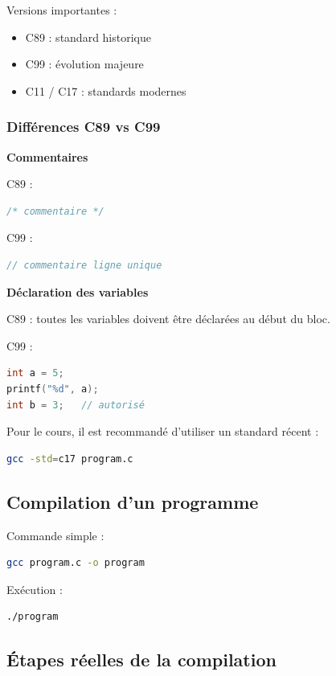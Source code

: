 Versions importantes :

\begin{itemize}
    \item C89 : standard historique
    \item C99 : évolution majeure
    \item C11 / C17 : standards modernes
\end{itemize}

\subsubsection{Différences C89 vs C99}

\textbf{Commentaires}

C89 :
\begin{lstlisting}[language=C]
/* commentaire */
\end{lstlisting}

C99 :
\begin{lstlisting}[language=C]
// commentaire ligne unique
\end{lstlisting}

\textbf{Déclaration des variables}

C89 : toutes les variables doivent être déclarées au début du bloc.

C99 :
\begin{lstlisting}[language=C]
int a = 5;
printf("%d", a);
int b = 3;   // autorisé
\end{lstlisting}

Pour le cours, il est recommandé d’utiliser un standard récent :

\begin{lstlisting}[language=bash]
gcc -std=c17 program.c
\end{lstlisting}

\subsection{Compilation d’un programme}

Commande simple :

\begin{lstlisting}[language=bash]
gcc program.c -o program
\end{lstlisting}

Exécution :

\begin{lstlisting}[language=bash]
./program
\end{lstlisting}

\subsection{Étapes réelles de la compilation}

